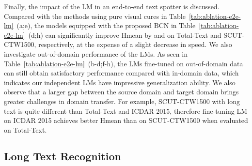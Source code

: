\documentclass[10pt,journal,compsoc]{IEEEtran}
\begin{document}
Finally, the impact of the LM in an end-to-end text spotter is discussed. Compared with the methods using pure visual cures in Table~\ref{tab:ablation-e2e-lm}~(a;e), the models equipped with the proposed BCN in Table~\ref{tab:ablation-e2e-lm}~(d;h) can significantly improve Hmean by  and  on Total-Text and SCUT-CTW1500, respectively, at the expense of a slight decrease in speed. We also investigate out-of-domain performance of the LMs. As seen in Table~\ref{tab:ablation-e2e-lm}~(b-d;f-h), the LMs fine-tuned on out-of-domain data can still obtain satisfactory performance compared with in-domain data, which indicates our independent LMs have impressive generalization ability. We also observe that a larger gap between the source domain and target domain brings greater challenges in domain transfer. For example, SCUT-CTW1500 with long text is quite different than Total-Text and ICDAR 2015, therefore fine-tuning LM on ICDAR 2015 achieves better Hmean than on SCUT-CTW1500 when evaluated on Total-Text.


\subsection{Long Text Recognition}
\label{sec:exp_e2e_long_text}
\end{document}
